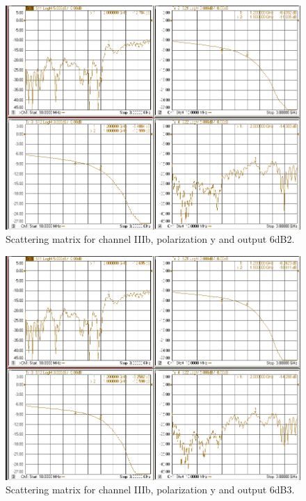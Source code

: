 \documentclass[12pt,a4paper,oneside]{article}
\begin{document}
\begin{figure}[H]
\centering
\includegraphics[width=0.9\linewidth]{VNA_results/IIIby_6dB2.png}
\caption{Scattering matrix for channel IIIb, polarization y and output 6dB2.}
\label{fig:IIIby_6dB2}
\end{figure}


\begin{figure}[H]
\centering
\includegraphics[width=0.9\linewidth]{VNA_results/IIIby_6dB3.png}
\caption{Scattering matrix for channel IIIb, polarization y and output 6dB3.}
\label{fig:IIIby_6dB3}
\end{figure}
\end{document}
